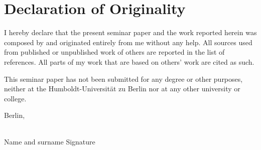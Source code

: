 \newpage
\thispagestyle{empty}  %

\section*{Declaration of Originality}

I hereby declare that the present seminar paper and the work reported herein was composed by and originated entirely from me without any help. All sources used from published or unpublished work of others are reported in the list of references. All parts of my work that are based on others’ work are cited as such.

This seminar paper has not been submitted for any degree or other purposes, neither at the Humboldt-Universität zu Berlin nor at any other university or college.

\vspace{20mm}

Berlin, \hrulefill

\vspace{30mm}

\hrulefill \\
Name and surname \hspace{20mm} Signature